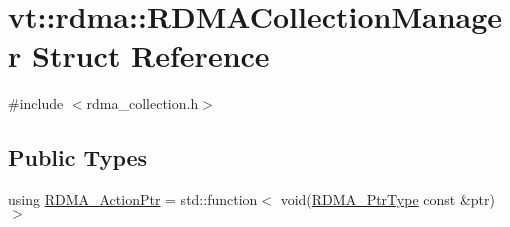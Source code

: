 \hypertarget{structvt_1_1rdma_1_1_r_d_m_a_collection_manager}{}\section{vt\+:\+:rdma\+:\+:R\+D\+M\+A\+Collection\+Manager Struct Reference}
\label{structvt_1_1rdma_1_1_r_d_m_a_collection_manager}


{\ttfamily \#include $<$rdma\+\_\+collection.\+h$>$}

\subsection*{Public Types}
\begin{DoxyCompactItemize}
\item 
using \hyperlink{structvt_1_1rdma_1_1_r_d_m_a_collection_manager_a4618a654161e92d2fcc2ab099eba9b65}{R\+D\+M\+A\+\_\+\+Action\+Ptr} = std\+::function$<$ void(\hyperlink{namespacevt_a9e2c953286c7616f7c218e9951790776}{R\+D\+M\+A\+\_\+\+Ptr\+Type} const  \&ptr)$>$
\end{DoxyCompactItemize}
